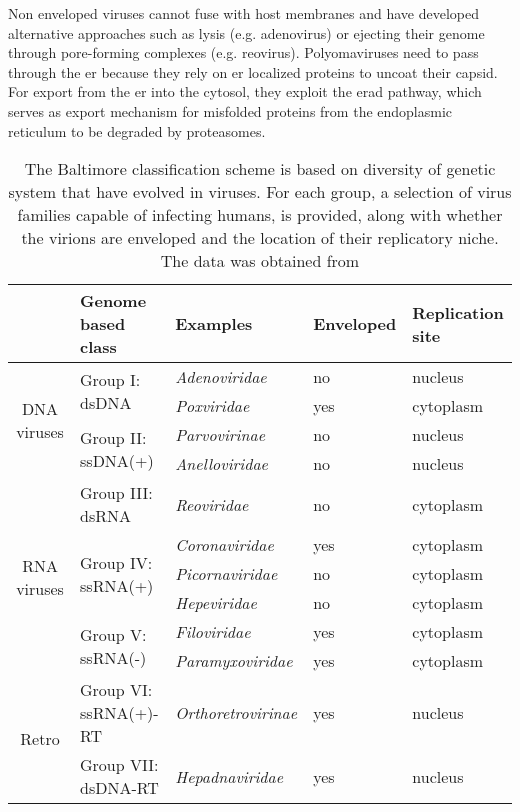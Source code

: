 Non enveloped viruses cannot fuse with host membranes and have developed alternative approaches such as lysis (e.g. adenovirus) or ejecting their genome through pore-forming complexes (e.g. reovirus). Polyomaviruses need to pass through the \gls{er} because they rely on \gls{er} localized proteins to uncoat their capsid. For export from the \gls{er} into the cytosol, they exploit the \gls{erad} pathway, which serves as export mechanism for misfolded proteins from the endoplasmic reticulum to be degraded by proteasomes.

\renewcommand{\arraystretch}{1.5}

\begin{table}
  \centering
  \caption[The Baltimore classification scheme for viruses]{The Baltimore classification scheme is based on diversity of genetic system that have evolved in viruses. For each group, a selection of virus families capable of infecting humans, is provided, along with whether the virions are enveloped and the location of their replicatory niche. The data was obtained from \cite{Hulo2011}}
  \label{tab:baltimore-classification}
  \footnotesize
  \begin{tabular}{c|l|lll}
    & Genome based class & Examples & Enveloped & Replication site \\
    \hline \multirow{4}{*}{\begin{sideways}DNA viruses\end{sideways}} &
    \multirow{2}{*}{Group I: dsDNA} &
    \textit{Adenoviridae} &
    no & nucleus \\
    &
    & \textit{Poxviridae} &
    yes & cytoplasm \\
    \cline{2-5} &
    \multirow{2}{*}{Group II: ssDNA(+)} &
    \textit{Parvovirinae} &
    no & nucleus \\
    &
    & \textit{Anelloviridae} &
    no & nucleus \\
    \hline \multirow{6}{*}{\begin{sideways}RNA viruses\end{sideways}} &   
    Group III: dsRNA &
    \textit{Reoviridae} &
    no & cytoplasm \\
    \cline{2-5} &
    \multirow{3}{*}{Group IV: ssRNA(+)} &
    \textit{Coronaviridae} &
    yes & cytoplasm \\
    &
    & \textit{Picornaviridae} &
    no & cytoplasm \\
    &
    & \textit{Hepeviridae} &
    no & cytoplasm \\
    \cline{2-5} &
    \multirow{2}{*}{Group V: ssRNA(-)} &
    \textit{Filoviridae} &
    yes & cytoplasm \\
    &
    & \textit{Paramyxoviridae} &
    yes & cytoplasm \\
    \hline \multirow{2}{*}{\begin{sideways}Retro\end{sideways}} &   
    Group VI: ssRNA(+)-RT &
    \textit{Orthoretrovirinae} &
    yes & nucleus \\
    \cline{2-5} &
    Group VII: dsDNA-RT &
    \textit{Hepadnaviridae} &
    yes & nucleus \\
    \hline
  \end{tabular}
\end{table}

